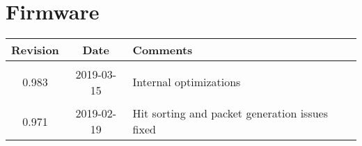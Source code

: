 \section{Firmware}
\begin{tabularx}{\textwidth}{|c|c|X|}
    \hline
    Revision & Date & Comments\\
    \hline\hline
    \hypertarget{fwrev}{0.983} & 2019-03-15 & Internal optimizations\\
    \hline
    {0.971} & 2019-02-19 & Hit sorting and packet generation issues fixed\\
    \hline
\end{tabularx}